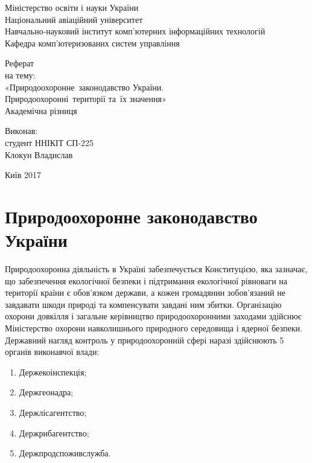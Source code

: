 \documentclass[a4paper,oneside,DIV=10,12pt]{scrreprt}
\begin{document}
	\begin{titlepage}
		\begin{center}
			Міністерство освіти і науки України\\
			Національний авіаційний університет\\
			Навчально-науковий інститут комп'ютерних інформаційних технологій\\
			Кафедра комп'ютеризованих систем управління
			
			\vspace{\fill}
				Реферат\\
				на тему:\\
				«Природоохоронне~законодавство України.\\
				Природоохоронні~території та~їх значення»\\
				Академічна різниця
				
			\vspace{\fill}
			
			\begin{flushright}
				Виконав:\\
				студент ННІКІТ СП-225\\
				Клокун Владислав\\
			\end{flushright}
			Київ 2017
		\end{center}
	\end{titlepage}
	
	\tableofcontents
	
	\chapter{Природоохоронне законодавство України}
		Природоохоронна діяльність в Україні забезпечується Конституцією, яка зазначає, що забезпечення екологічної безпеки і підтримання екологічної рівноваги на території країни є обов'\-яз\-ком держави, а кожен громадянин зобов'язаний не завдавати шкоди природі та компенсувати завдані ним збитки. Організацію охорони довкілля і загальне керівництво природоохоронними заходами здійснює Міністерство охорони навколишнього природного середовища і ядерної безпеки. Державний нагляд контроль у природоохоронній сфері наразі здійснюють 5 органів виконавчої влади:
		\begin{enumerate}
			\item Держ\-еко\-інспекція;
			\item Держ\-гео\-надра;
			\item Держ\-ліс\-агентство;
			\item Держ\-риб\-а\-гент\-ство;
			\item Держ\-прод\-спожив\-служба.
		\end{enumerate}
		
\end{document}
